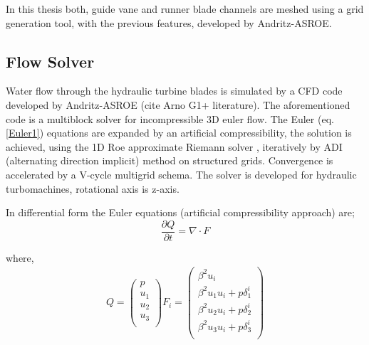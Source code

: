 In this thesis both, guide vane and runner blade channels are meshed using a grid generation tool, with the previous features, developed by Andritz-ASROE. 


\subsection{Flow Solver}
\label{FlowSolvert}
Water flow through the hydraulic turbine blades is simulated by a CFD code developed by Andritz-ASROE (cite Arno G1+ literature). The aforementioned code is a multiblock solver for incompressible 3D euler flow. The Euler (eq. \ref{Euler1}) equations are expanded by an artificial compressibility, the solution is achieved, using the 1D Roe approximate Riemann solver \cite{Roe81}, iteratively by ADI (alternating direction implicit) method on structured grids. Convergence is accelerated by a V-cycle multigrid schema. The solver is developed for hydraulic turbomachines, rotational axis is z-axis.


In differential form the Euler equations (artificial compressibility approach) are;
\begin{equation} 
    \frac{\partial Q}{\partial t}=\nabla \cdot F
	\label{Euler1}
\end{equation}

where,
\begin{eqnarray}
		Q= \left( {\begin{array}{c}
 		p    \\
 		u_1  \\
 		u_2  \\
 		u_3  \\
 		\end{array} } \right)
 		F_i= \left( {\begin{array}{c}
 		\beta ^2 u_i    \\
 		\beta ^2 u_1u_i + p\delta _1^i  \\
		\beta ^2 u_2u_i + p\delta _2^i  \\
 		\beta ^2 u_3u_i + p\delta _3^i  \\
 		\end{array} } \right)
\label{Euler3}
\end{eqnarray} 
 
